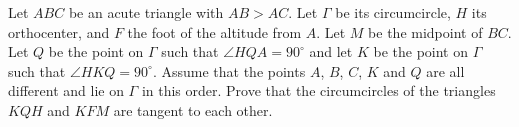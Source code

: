 Let $ABC$ be an acute triangle with $AB > AC$. Let $\Gamma$ be its circumcircle, $H$ its orthocenter, and $F$ the foot of the altitude from $A$. Let $M$ be the midpoint of $BC$. Let $Q$ be the point on $\Gamma$ such that $\angle HQA = 90^\circ$ and let $K$ be the point on $\Gamma$ such that $\angle HKQ = 90^\circ$. Assume that the points $A$, $B$, $C$, $K$ and $Q$ are all different and lie on $\Gamma$ in this order. Prove that the circumcircles of the triangles $KQH$ and $KFM$ are tangent to each other.
